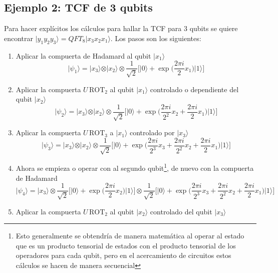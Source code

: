 \documentclass[a4paper]{article}
\begin{document}
\subsection{Ejemplo 2: TCF de 3 qubits}
Para hacer explícitos los cálculos para hallar la TCF para 3 qubits se quiere encontrar $\vert y_1 y_2 y_3\rangle=QFT_8\vert x_3 x_2 x_1\rangle$. Los pasos son los siguientes:
\begin{enumerate}
\item Aplicar la compuerta de Hadamard al qubit $\vert x_1 \rangle$
\begin{equation}
\vert \psi_1\rangle=\vert x_3\rangle\otimes \vert x_2\rangle\otimes\frac{1}{\sqrt{2}}\bigg[ \vert 0\rangle + \exp{\bigg(\frac{2\pi i}{2} x_1\bigg)}\vert 1\rangle\bigg]
\end{equation}
\item Aplicar la compuerta $U\,\text{ROT}_2$ al qubit $\vert x_1\rangle$ controlado o dependiente del qubit $\vert x_2\rangle$
\begin{equation}
\vert \psi_2\rangle=\vert x_3\rangle\otimes \vert x_2\rangle\otimes\frac{1}{\sqrt{2}}\bigg[ \vert 0\rangle + \exp{\bigg(\frac{2\pi i}{2^2} x_2+\frac{2\pi i}{2} x_1\bigg)}\vert 1\rangle\bigg]
\end{equation}
\item Aplicar la compuerta $U\,\text{ROT}_3$ a $\vert x_1\rangle$ controlado por $\vert x_3\rangle$
\begin{equation}
\vert \psi_3\rangle=\vert x_3\rangle\otimes \vert x_2\rangle\otimes\frac{1}{\sqrt{2}}\bigg[ \vert 0\rangle + \exp{\bigg(\frac{2\pi i}{2^3} x_3 +\frac{2\pi i}{2^2} x_2+\frac{2\pi i}{2} x_1\bigg)}\vert 1\rangle\bigg]
\end{equation}
\item Ahora se empieza o operar con al segundo qubit\footnote{Esto generalmente se obtendría de manera matemática al operar al estado que es un producto tensorial de estados con el producto tensorial de los operadores para cada qubit, pero en el acercamiento de circuitos estos cálculos se hacen de manera secuencial}, de nuevo con la compuerta de Hadamard
\begin{equation}
\vert \psi_4\rangle=\vert x_3\rangle \otimes \frac{1}{\sqrt{2}}\bigg[ \vert 0\rangle + \exp{\bigg( \frac{2\pi i}{2} x_2 \bigg)}\vert 1\rangle\bigg] \otimes  \frac{1}{\sqrt{2}}\bigg[ \vert 0\rangle + \exp{\bigg(\frac{2\pi i}{2^3} x_3 +\frac{2\pi i}{2^2} x_2+\frac{2\pi i}{2} x_1\bigg)}\vert 1\rangle\bigg]
\end{equation}
\item Aplicar la compuerta $U\,\text{ROT}_2$ al qubit $\vert x_2\rangle$ controlado del qubit $\vert x_3\rangle$

\end{enumerate}
\end{document}
